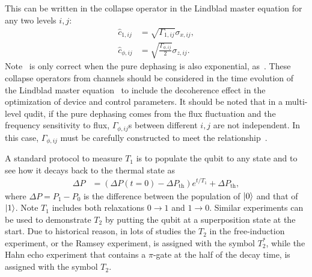 \documentclass[a4paper,onecolumn,11pt,unpublished]{quantumarticle}
\newcommand{\DeltaPthermal}{\Delta P_{\mathrm{th}}}
\begin{document}
This can be written in the collapse operator in the Lindblad master equation for any two levels $i,j$:
\begin{align}
  \hat{c}_{1,ij}    & = \sqrt{\Gamma_{1,ij}}\sigma_{x,ij}, \label{eq:collapse_t1}                \\
  \hat{c}_{\phi,ij} & = \sqrt{\frac{\Gamma_{\phi,ij}}{2}}\sigma_{z,ij}. \label{eq:collapse_tphi}
\end{align}
Note~ is only correct when the pure dephasing is also exponential, as~. These collapse operators from channels should be considered in the time evolution of the Lindblad master equation~ to include the decoherence effect in the optimization of device and control parameters.
It should be noted that in a multi-level qudit, if the pure dephasing comes from the flux fluctuation and the frequency sensitivity to flux, $\Gamma_{\phi,ij}$s between different $i,j$ are not independent. In this case, $\Gamma_{\phi,ij}$
must be carefully constructed to meet the relationship~\cite{Rol2019Fast}.

A standard protocol to measure $T_1$ is to populate the qubit to any state and to see how it decays back to the thermal state as
\begin{align}
  \Delta P & = (\Delta P(t=0) - \DeltaPthermal)e^{t/T_1} + \DeltaPthermal, \label{eq:t1_exp_decay}
\end{align}
where $\Delta P=P_1-P_0$ is the difference between the population of $\ket{0}$ and that of $\ket{1}$. Note $T_1$ includes both relaxations $0\rightarrow 1$ and $1\rightarrow 0$.
Similar experiments can be used to demonstrate $T_2$ by putting the qubit at a superposition state at the start. Due to historical reason, in lots of studies the $T_2$ in the free-induction experiment, or the Ramsey experiment, is assigned with the symbol $T_2^*$, while the Hahn echo experiment that contains a $\pi$-gate at the half of the decay time, is assigned with the symbol $T_2$.
\end{document}
